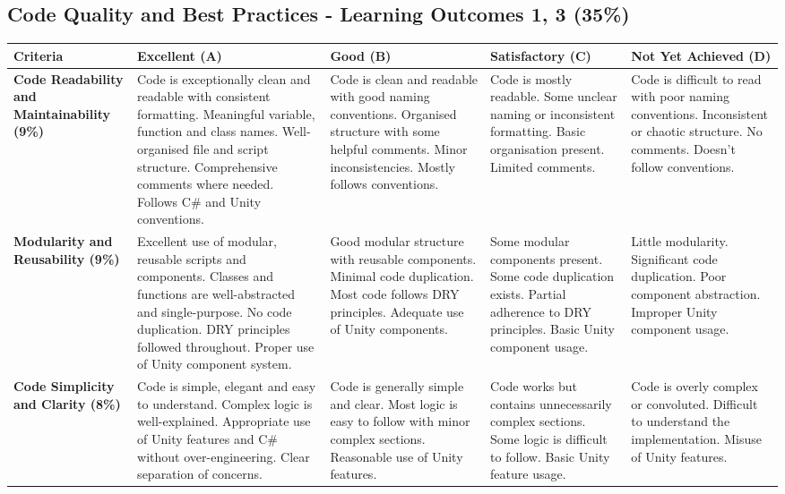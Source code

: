 \documentclass{article}
\begin{document}
\begin{landscape}
\begin{tabular}{|p{5cm}|p{4cm}|p{4cm}|p{4cm}|p{4cm}|}
\end{tabular}

\subsection*{Code Quality and Best Practices - Learning Outcomes 1, 3 (35\%)}

\begin{tabular}{|p{5cm}|p{4cm}|p{4cm}|p{4cm}|p{4cm}|}
\hline
\textbf{Criteria} & \textbf{Excellent (A)} & \textbf{Good (B)} & \textbf{Satisfactory (C)} & \textbf{Not Yet Achieved (D)} \\ \hline

\textbf{Code Readability and Maintainability (9\%)} & 
Code is exceptionally clean and readable with consistent formatting. Meaningful variable, function and class names. Well-organised file and script structure. Comprehensive comments where needed. Follows C\# and Unity conventions. & 
Code is clean and readable with good naming conventions. Organised structure with some helpful comments. Minor inconsistencies. Mostly follows conventions. & 
Code is mostly readable. Some unclear naming or inconsistent formatting. Basic organisation present. Limited comments. & 
Code is difficult to read with poor naming conventions. Inconsistent or chaotic structure. No comments. Doesn't follow conventions. \\ \hline

\textbf{Modularity and Reusability (9\%)} & 
Excellent use of modular, reusable scripts and components. Classes and functions are well-abstracted and single-purpose. No code duplication. DRY principles followed throughout. Proper use of Unity component system. & 
Good modular structure with reusable components. Minimal code duplication. Most code follows DRY principles. Adequate use of Unity components. & 
Some modular components present. Some code duplication exists. Partial adherence to DRY principles. Basic Unity component usage. & 
Little modularity. Significant code duplication. Poor component abstraction. Improper Unity component usage. \\ \hline

\textbf{Code Simplicity and Clarity (8\%)} & 
Code is simple, elegant and easy to understand. Complex logic is well-explained. Appropriate use of Unity features and C\# without over-engineering. Clear separation of concerns. & 
Code is generally simple and clear. Most logic is easy to follow with minor complex sections. Reasonable use of Unity features. & 
Code works but contains unnecessarily complex sections. Some logic is difficult to follow. Basic Unity feature usage. & 
Code is overly complex or convoluted. Difficult to understand the implementation. Misuse of Unity features. \\ \hline


\end{tabular}
\end{landscape}
\end{document}
